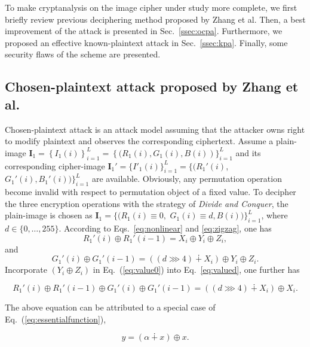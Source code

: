 \documentclass{ws-ijbc}
\begin{document}
To make cryptanalysis on the image cipher under study more complete, we first briefly
review previous deciphering method proposed by Zhang et al. Then, a best improvement of the attack
is presented in Sec.~\ref{ssec:ocpa}. Furthermore, we proposed an effective known-plaintext attack in Sec.~\ref{ssec:kpa}.
Finally, some security flaws of the scheme are presented.

\subsection{Chosen-plaintext attack proposed by Zhang et al.}
\label{subsec:cpa:zhang}

Chosen-plaintext attack is an attack model assuming that the attacker owns right to modify
plaintext and observes the corresponding ciphertext. Assume a plain-image $\mathbf{I}_1=\left\{I_1(i)\right\}_{i=1}^{L}=\left\{(R_1(i), G_1(i), B(i)\right)\}_{i=1}^{L}$ and its corresponding cipher-image $\mathbf{I}_1'=\{I'_1(i)\}_{i=1}^{L}=\{(R_1'(i)$, $G_1'(i), B_1'(i))\}_{i=1}^{L}$ are available.
Obviously, any permutation operation become invalid with respect to permutation object of a fixed value. To decipher the three encryption operations with the strategy of
\textit{Divide and Conquer}, the plain-image is chosen as $\mathbf{I}_1=\{(R_1(i)\equiv 0,$ $G_1(i)\equiv d, B(i))\}_{i=1}^{L}$, where $d\in \{0, \ldots, 255\}$. According to Eqs.~\eqref{eq:nonlinear} and \eqref{eq:zigzag}, one has
\begin{equation}
\label{eq:value0}
R_1'(i) \oplus R_1'(i-1) = X_{i} \oplus Y_{i} \oplus Z_{i},
\end{equation}
and
\begin{equation}
\label{eq:valued}
G_1'(i) \oplus G_1'(i-1) = \left(\left(d \ggg 4\right) \dotplus X_{i}\right) \oplus Y_{i} \oplus Z_{i}.
\end{equation}
Incorporate $(Y_{i} \oplus Z_{i})$ in Eq.~(\ref{eq:value0}) into Eq.~\eqref{eq:valued}, one further has
\begin{linenomath}
\begin{equation}
\label{eq:zhangcore}
R_1'(i) \oplus R_1'(i-1) \oplus G_1'(i) \oplus G_1'(i-1)
= \left(\left(d \ggg 4\right) \dotplus X_{i}\right) \oplus X_{i}.
\end{equation}
\end{linenomath}
The above equation can be attributed to a special case of Eq.~(\ref{eq:essentialfunction}),
\begin{linenomath}
\begin{equation}
\nonumber
y = (\alpha \dotplus x) \oplus x.
\end{equation}
\end{linenomath}
\end{document}
